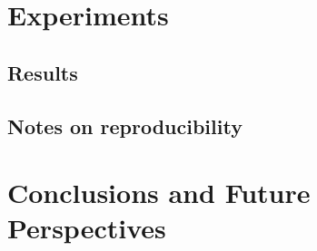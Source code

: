 \documentclass{article}
\begin{document}

\section{Experiments }

\subsection{Results}

\subsection{Notes on reproducibility}


\section{Conclusions and Future Perspectives}
\end{document}
